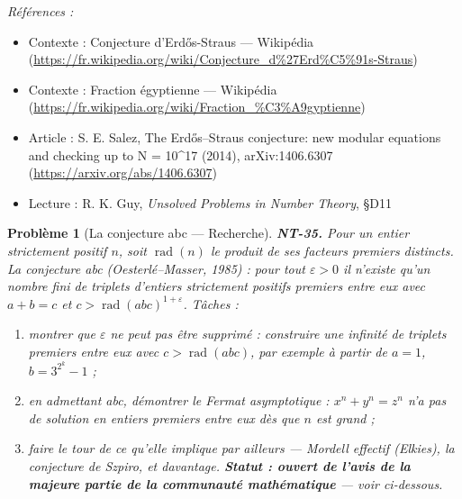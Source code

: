 \documentclass[11pt]{article}
\newtheorem{problem}{Problème}
\newenvironment{refs}{\par\small\noindent\emph{Références :}\begin{itemize}\setlength\itemsep{0pt}}{\end{itemize}\normalsize}
\begin{document}
\begin{refs}
\item Contexte : Conjecture d'Erd\H{o}s-Straus --- Wikipédia (\url{https://fr.wikipedia.org/wiki/Conjecture_d%27Erd%C5%91s-Straus})
\item Contexte : Fraction égyptienne --- Wikipédia (\url{https://fr.wikipedia.org/wiki/Fraction_%C3%A9gyptienne})
\item Article : S. E. Salez, \og{} The Erd\H{o}s--Straus conjecture: new modular equations and checking up to N = 10\textasciicircum{}17 \fg{} (2014), arXiv:1406.6307 (\url{https://arxiv.org/abs/1406.6307})
\item Lecture : R. K. Guy, \textit{Unsolved Problems in Number Theory}, \S{}D11
\end{refs}

\bigskip

\begin{problem}[{La conjecture abc --- Recherche}]
\textbf{NT-35.} Pour un entier strictement positif $n$, soit
$\operatorname{rad}(n)$ le produit de ses facteurs premiers distincts. La conjecture abc
(Oesterlé--Masser, 1985) : pour tout $\varepsilon > 0$ il n'existe qu'un nombre fini de
triplets d'entiers strictement positifs premiers entre eux avec $a + b = c$ et
$c > \operatorname{rad}(abc)^{1+\varepsilon}$. Tâches :
\begin{enumerate}
\item[(i)] montrer que $\varepsilon$
ne peut pas être supprimé : construire une infinité de triplets premiers entre eux avec
$c > \operatorname{rad}(abc)$, par exemple à partir de $a = 1$,
$b = 3^{2^k} - 1$ ;
\item[(ii)] en admettant abc, démontrer le \og{} Fermat asymptotique \fg{} :
$x^n + y^n = z^n$ n'a pas de solution en entiers premiers entre eux dès que $n$ est grand ;
\item[(iii)] faire le tour de ce qu'elle implique par ailleurs --- Mordell effectif (Elkies), la conjecture de
Szpiro, et davantage.
\textbf{Statut : ouvert de l'avis de la majeure partie de la communauté mathématique} --- voir
ci-dessous.
\end{enumerate}

\end{problem}
\end{document}
